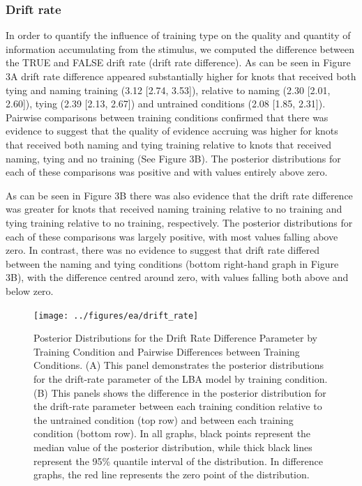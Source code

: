 \documentclass[
  man, donotrepeattitle,floatsintext]{apa6}
\begin{document}
\subsubsection{Drift rate}\label{drift-rate}

In order to quantify the influence of training type on the quality and quantity of information accumulating from the stimulus, we computed the difference between the TRUE and FALSE drift rate (drift rate difference). As can be seen in Figure 3A drift rate difference appeared substantially higher for knots that received both tying and naming training (3.12 {[}2.74, 3.53{]}), relative to naming (2.30 {[}2.01, 2.60{]}), tying (2.39 {[}2.13, 2.67{]}) and untrained conditions (2.08 {[}1.85, 2.31{]}). Pairwise comparisons between training conditions confirmed that there was evidence to suggest that the quality of evidence accruing was higher for knots that received both naming and tying training relative to knots that received naming, tying and no training (See Figure 3B). The posterior distributions for each of these comparisons was positive and with values entirely above zero.

As can be seen in Figure 3B there was also evidence that the drift rate difference was greater for knots that received naming training relative to no training and tying training relative to no training, respectively. The posterior distributions for each of these comparisons was largely positive, with most values falling above zero. In contrast, there was no evidence to suggest that drift rate differed between the naming and tying conditions (bottom right-hand graph in Figure 3B), with the difference centred around zero, with values falling both above and below zero.



\begin{figure}[H]

{\centering \texttt{[image: ../figures/ea/drift\_rate]} 

}

\caption{Posterior Distributions for the Drift Rate Difference Parameter by Training Condition and Pairwise Differences between Training Conditions. (A) This panel demonstrates the posterior distributions for the drift-rate parameter of the LBA model by training condition. (B) This panels shows the difference in the posterior distribution for the drift-rate parameter between each training condition relative to the untrained condition (top row) and between each training condition (bottom row). In all graphs, black points represent the median value of the posterior distribution, while thick black lines represent the 95\% quantile interval of the distribution. In difference graphs, the red line represents the zero point of the distribution.}\label{fig:drift-rate-plot}
\end{figure}
\end{document}
